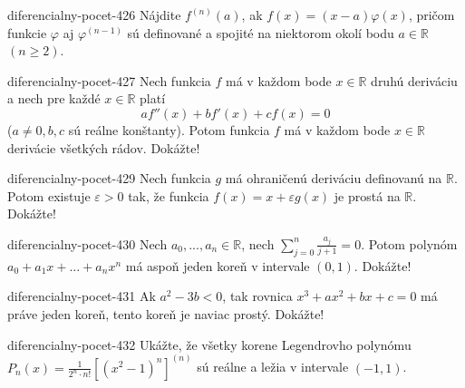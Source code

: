 \begin{defproblem}{diferencialny-pocet-426}
Nájdite $f^{(n)}(a)$, ak $f(x)=(x-a)\varphi (x)$, pričom funkcie $\varphi$ aj $\varphi^{(n-1)}$ sú definované a spojité na niektorom okolí bodu $a\in\mathbb{R}$ $(n\geq 2)$.
\end{defproblem}

\begin{defproblem}{diferencialny-pocet-427}
Nech funkcia $f$ má v každom bode $x\in\mathbb{R}$ druhú deriváciu a nech pre každé $x\in\mathbb{R}$ platí
$$af''(x)+bf'(x)+cf(x)=0$$
($a\neq 0,b,c$ sú reálne konštanty). Potom funkcia $f$ má v každom bode $x\in\mathbb{R}$ derivácie všetkých rádov. Dokážte!
\end{defproblem}


\begin{defproblem}{diferencialny-pocet-429}
Nech funkcia $g$ má ohraničenú deriváciu definovanú na $\mathbb{R}$. Potom existuje $\varepsilon >0$ tak, že funkcia $f(x)=x+\varepsilon g(x)$ je prostá na $\mathbb{R}$. Dokážte!
\end{defproblem}

\begin{defproblem}{diferencialny-pocet-430}
Nech $a_0,...,a_n\in\mathbb{R}$, nech $\sum_{j=0}^n\frac{a_j}{j+1}=0$. Potom polynóm $a_0+a_1x+...+a_nx^n$ má aspoň jeden koreň v intervale $(0,1)$. Dokážte!
\end{defproblem}

\begin{defproblem}{diferencialny-pocet-431}
Ak $a^2-3b<0$, tak rovnica $x^3+ax^2+bx+c=0$ má práve jeden koreň, tento koreň je naviac prostý. Dokážte!
\end{defproblem}

\begin{defproblem}{diferencialny-pocet-432}
Ukážte, že všetky korene Legendrovho polynómu $P_n(x)=\frac{1}{2^n\cdot n!}[(x^2-1)^n]^{(n)}$ sú reálne a ležia v intervale $(-1,1)$.
\end{defproblem}

